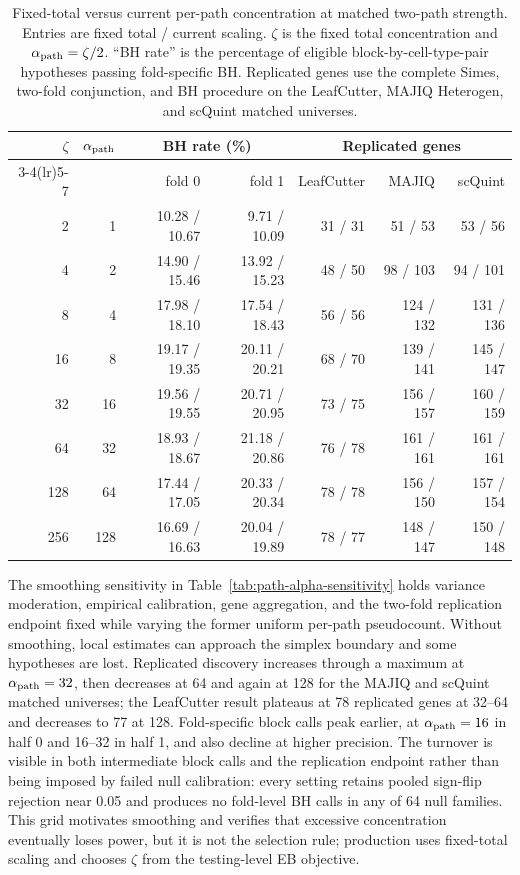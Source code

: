 \documentclass[11pt]{article}
\begin{document}
\begin{table}[H]
\centering
\scriptsize
\caption{Fixed-total versus current per-path concentration at matched two-path strength. Entries are fixed total / current scaling. \(\zeta\) is the fixed total concentration and \(\alpha_{\rm path}=\zeta/2\). ``BH rate'' is the percentage of eligible block-by-cell-type-pair hypotheses passing fold-specific BH. Replicated genes use the complete Simes, two-fold conjunction, and BH procedure on the LeafCutter, MAJIQ Heterogen, and scQuint matched universes.}
\label{tab:path-alpha-scaling}
\begin{tabular}{rrrrrrr}
\toprule
\(\zeta\) & \(\alpha_{\rm path}\) & \multicolumn{2}{c}{BH rate (\%)} & \multicolumn{3}{c}{Replicated genes}\\
\cmidrule(lr){3-4}\cmidrule(lr){5-7}
& & fold 0 & fold 1 & LeafCutter & MAJIQ & scQuint\\
\midrule
2 & 1 & 10.28 / 10.67 & 9.71 / 10.09 & 31 / 31 & 51 / 53 & 53 / 56\\
4 & 2 & 14.90 / 15.46 & 13.92 / 15.23 & 48 / 50 & 98 / 103 & 94 / 101\\
8 & 4 & 17.98 / 18.10 & 17.54 / 18.43 & 56 / 56 & 124 / 132 & 131 / 136\\
16 & 8 & 19.17 / 19.35 & 20.11 / 20.21 & 68 / 70 & 139 / 141 & 145 / 147\\
32 & 16 & 19.56 / 19.55 & 20.71 / 20.95 & 73 / 75 & 156 / 157 & 160 / 159\\
64 & 32 & 18.93 / 18.67 & 21.18 / 20.86 & 76 / 78 & 161 / 161 & 161 / 161\\
128 & 64 & 17.44 / 17.05 & 20.33 / 20.34 & 78 / 78 & 156 / 150 & 157 / 154\\
256 & 128 & 16.69 / 16.63 & 20.04 / 19.89 & 78 / 77 & 148 / 147 & 150 / 148\\
\bottomrule
\end{tabular}
\end{table}

The smoothing sensitivity in Table~\ref{tab:path-alpha-sensitivity} holds variance moderation, empirical calibration, gene aggregation, and the two-fold replication endpoint fixed while varying the former uniform per-path pseudocount. Without smoothing, local estimates can approach the simplex boundary and some hypotheses are lost. Replicated discovery increases through a maximum at \(\alpha_{\rm path}=32\), then decreases at 64 and again at 128 for the MAJIQ and scQuint matched universes; the LeafCutter result plateaus at 78 replicated genes at 32--64 and decreases to 77 at 128. Fold-specific block calls peak earlier, at \(\alpha_{\rm path}=16\) in half 0 and 16--32 in half 1, and also decline at higher precision. The turnover is visible in both intermediate block calls and the replication endpoint rather than being imposed by failed null calibration: every setting retains pooled sign-flip rejection near 0.05 and produces no fold-level BH calls in any of 64 null families. This grid motivates smoothing and verifies that excessive concentration eventually loses power, but it is not the selection rule; production uses fixed-total scaling and chooses \(\zeta\) from the testing-level EB objective.
\end{document}
